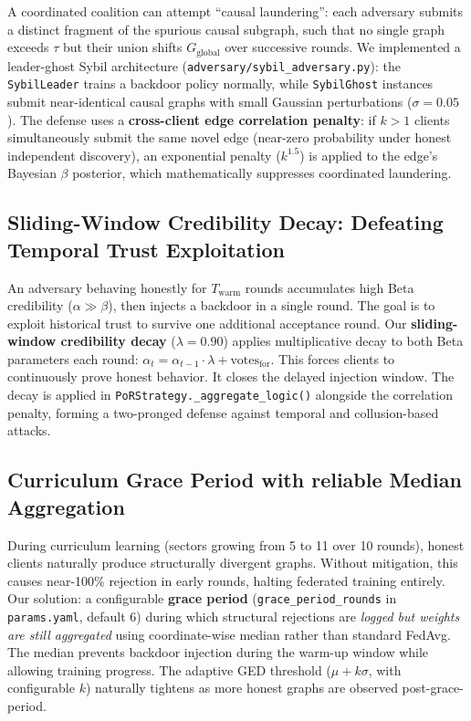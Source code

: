 \documentclass[journal]{IEEEtran}
\begin{document}
A coordinated coalition can attempt ``causal laundering'': each adversary submits a distinct fragment of the spurious causal subgraph, such that no single graph exceeds $\tau$ but their union shifts $G_{\text{global}}$ over successive rounds. We implemented a leader-ghost Sybil architecture (\texttt{adversary/sybil\_adversary.py}): the \texttt{SybilLeader} trains a backdoor policy normally, while \texttt{SybilGhost} instances submit near-identical causal graphs with small Gaussian perturbations ($\sigma = 0.05$). The defense uses a \textbf{cross-client edge correlation penalty}: if $k>1$ clients simultaneously submit the same novel edge (near-zero probability under honest independent discovery), an exponential penalty ($k^{1.5}$) is applied to the edge's Bayesian $\beta$ posterior, which mathematically suppresses coordinated laundering.

\subsection{Sliding-Window Credibility Decay: Defeating Temporal Trust Exploitation}

An adversary behaving honestly for $T_{\text{warm}}$ rounds accumulates high Beta credibility ($\alpha \gg \beta$), then injects a backdoor in a single round. The goal is to exploit historical trust to survive one additional acceptance round. Our \textbf{sliding-window credibility decay} ($\lambda = 0.90$) applies multiplicative decay to both Beta parameters each round: $\alpha_t = \alpha_{t-1} \cdot \lambda + \text{votes}_{\text{for}}$. This forces clients to continuously prove honest behavior. It closes the delayed injection window. The decay is applied in \texttt{PoRStrategy.\_aggregate\_logic()} alongside the correlation penalty, forming a two-pronged defense against temporal and collusion-based attacks.

\subsection{Curriculum Grace Period with reliable Median Aggregation}

During curriculum learning (sectors growing from 5 to 11 over 10 rounds), honest clients naturally produce structurally divergent graphs. Without mitigation, this causes near-100\% rejection in early rounds, halting federated training entirely. Our solution: a configurable \textbf{grace period} (\texttt{grace\_period\_rounds} in \texttt{params.yaml}, default 6) during which structural rejections are \emph{logged but weights are still aggregated} using coordinate-wise median rather than standard FedAvg. The median prevents backdoor injection during the warm-up window while allowing training progress. The adaptive GED threshold ($\mu + k\sigma$, with configurable $k$) naturally tightens as more honest graphs are observed post-grace-period.
\end{document}
